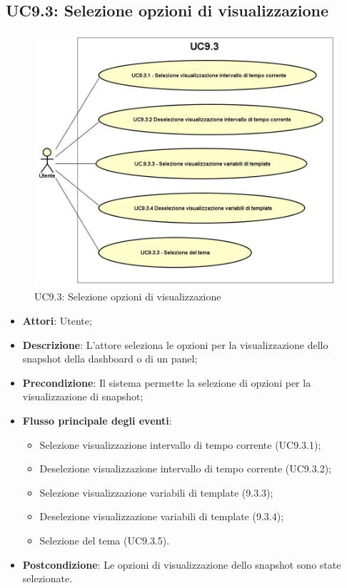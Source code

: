 \subsection{UC9.3: Selezione opzioni di visualizzazione}
\begin{figure} [H]
	\centering
	\includegraphics[scale=0.45]{Img/UC9-3}
	\caption{UC9.3: Selezione opzioni di visualizzazione}\label{}
\end{figure}
\begin{itemize}
	\item \textbf{Attori}: Utente;
	\item \textbf{Descrizione}: L'attore seleziona le opzioni per la visualizzazione dello snapshot della dashboard o di un panel;
	\item \textbf{Precondizione}: Il sistema permette la selezione di opzioni per la visualizzazione di snapshot;
	\item \textbf{Flusso principale degli eventi}:
	\begin{itemize}
		\item Selezione visualizzazione intervallo di tempo corrente (UC9.3.1);
		\item Deselezione visualizzazione intervallo di tempo corrente (UC9.3.2);
		\item Selezione visualizzazione variabili di template (9.3.3);
		\item Deselezione visualizzazione variabili di template (9.3.4);
		\item Selezione del tema (UC9.3.5).
	\end{itemize}
	\item \textbf{Postcondizione}: Le opzioni di visualizzazione dello snapshot sono state selezionate.
\end{itemize}

